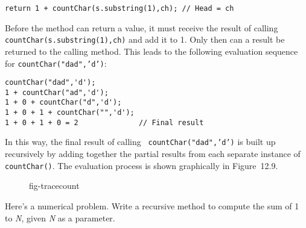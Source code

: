 \begin{jjjlisting}
\begin{lstlisting}
return 1 + countChar(s.substring(1),ch); // Head = ch
\end{lstlisting}
\end{jjjlisting}

\noindent Before the method can return a value, it must receive the
result of calling {\tt countChar(s.substring(1),ch)} and add it to
1. Only then can a result be returned to the calling method.   This
leads to the following evaluation sequence for
{\tt countChar("dad",'d')}:

\begin{jjjlisting}
\begin{lstlisting}
countChar("dad",'d');
1 + countChar("ad",'d');
1 + 0 + countChar("d",'d');
1 + 0 + 1 + countChar("",'d');
1 + 0 + 1 + 0 = 2              // Final result
\end{lstlisting}
\end{jjjlisting}

\noindent In this way, the final result of calling {\tt
countChar("dad",'d')} is built up recursively by adding together the
partial results from each separate instance of {\tt countChar()}. The
evaluation process is shown graphically in Figure~12.9.

\begin{figure}[htb]
 {fig-tracecount}
\end{figure}



\begin{SSTUDY}

\item  Here's a numerical problem.  Write a recursive method to compute
the sum of 1 to {\it N}, given {\it N} as a parameter.

\end{SSTUDY}

